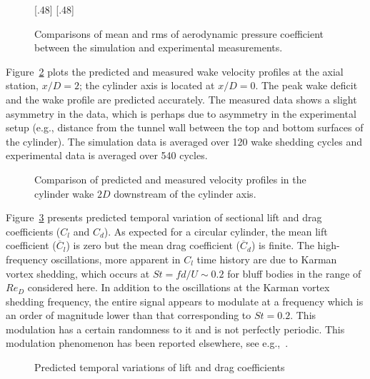 \begin{figure}[htb!]
  \centering
    [.48\linewidth]{}
  \hspace*{\fill}
    [.48\linewidth]{}
  \caption{Comparisons of mean and rms of aerodynamic pressure coefficient
  between the simulation and experimental measurements.}
  \label{fig:Cp_compared_Re20k}
\end{figure}

Figure~\ref{fig:velocity_Normal_Re20k} plots the predicted and measured wake
velocity profiles at the axial station, $x/D=2$; the cylinder axis is located
at $x/D=0$. The peak wake deficit and the wake profile are predicted
accurately. The measured data shows a slight asymmetry in the data, which is
perhaps due to asymmetry in the experimental setup (e.g., distance from the
tunnel wall between the top and bottom surfaces of the cylinder). The
simulation data is averaged over 120 wake shedding cycles and experimental data
is averaged over 540 cycles.
%
\begin{figure}[htb!]
  \caption{Comparison of predicted and measured velocity profiles in the
    cylinder wake $2D$ downstream of the cylinder axis.}
  \label{fig:velocity_Normal_Re20k}
\end{figure}

Figure~\ref{fig:force_20k} presents predicted temporal variation of sectional
lift and drag coefficients ($C_l$ and $C_d$). As expected for a circular
cylinder, the mean lift coefficient ($\overline{C}_l$) is zero but the mean
drag coefficient ($\overline{C}_d$) is finite. The high-frequency oscillations,
more apparent in $C_l$ time history are due to Karman vortex shedding, which
occurs at $St=fd/U \sim 0.2$ for bluff bodies in the range of $Re_D$ considered
here. In addition to the oscillations at the Karman vortex shedding frequency,
the entire signal appears to modulate at a frequency which is an order of
magnitude lower than that corresponding to $St=0.2$. This modulation has a
certain randomness to it and is not perfectly periodic. This modulation
phenomenon has been reported elsewhere, see e.g.,~\cite{travin2000detached}. 
%
\begin{figure}[htb!]
  \caption{Predicted temporal variations of lift and drag coefficients}
  \label{fig:force_20k}
\end{figure}

